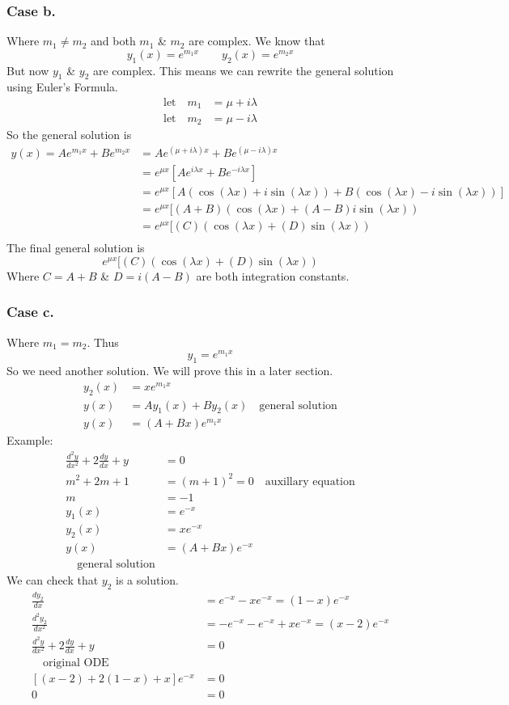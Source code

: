 \documentclass{article}
\newcommand{\ODE}[3]{#1\frac{d^2y}{dx^2} + #2\frac{dy}{dx} + #3y}
\begin{document}
\subsubsection{Case b.}
Where $m_1 \not= m_2$ and both $m_1$ \& $m_2$ are complex. We know that
$$y_1(x) = e^{m_1x} \quad\quad y_2(x) = e^{m_2x}$$
But now $y_1$ \& $y_2$ are complex.
This means we can rewrite the general solution using Euler's Formula.
\begin{align*}
    \textrm{let}\quad m_1 &= \mu + i\lambda\\
    \textrm{let}\quad m_2 &= \mu - i\lambda
\end{align*}
So the general solution is
\begin{align*}
    y(x) = Ae^{m_1x} + Be^{m_2x} &= Ae^{(\mu + i\lambda)x} + Be^{(\mu - i\lambda)x}\\
    &= e^{\mu x}[Ae^{i\lambda x} + Be^{-i\lambda x}]\\
    &= e^{\mu x}[A(\cos(\lambda x) + i\sin(\lambda x)) + B(\cos(\lambda x) - i\sin(\lambda x))]\\
    &= e^{\mu x}[(A+B)(\cos(\lambda x) + (A-B)i\sin(\lambda x))\\
    &= e^{\mu x}[(C)(\cos(\lambda x) + (D)\sin(\lambda x))\\
\end{align*}
The final general solution is
\[e^{\mu x}[(C)(\cos(\lambda x) + (D)\sin(\lambda x))\]
Where $C = A+B$ \& $D=i(A-B)$ are both integration constants.

\subsubsection{Case c.}
Where $m_1 = m_2$. Thus
\[y_1 = e^{m_1x}\]
So we need another solution. We will prove this in a later section.
\begin{align*}
    y_2(x) &= xe^{m_1x}\\
    y(x) &= Ay_1(x) + By_2(x) \quad\text{general solution}\\
    y(x) &= (A+Bx)e^{m_1x} 
\end{align*}
Example:
\begin{align*}
    \ODE{}{2}{} &= 0\\
    m^2 + 2m + 1 &= (m+1)^2 = 0 \quad\text{auxillary equation}\\
    m &= -1\\
    y_1(x) &= e^{-x}\\
    y_2(x) &= xe^{-x}\\
    y(x) &= (A+Bx)e^{-x}\\ \quad\text{general solution}
\end{align*}
We can check that $y_2$ is a solution.
\begin{align*}
    \frac{dy_2}{dx} &= e^{-x}-xe^{-x} = (1-x)e^{-x}\\
    \frac{d^2y_2}{dx^2} &= -e^{-x}-e^{-x}+xe^{-x} = (x-2)e^{-x}\\
    \ODE{}{2}{} &= 0\\ \quad\text{original ODE}\\
    [(x-2) + 2(1-x) + x]e^{-x} &= 0\\
    0 &= 0
\end{align*}
\end{document}
